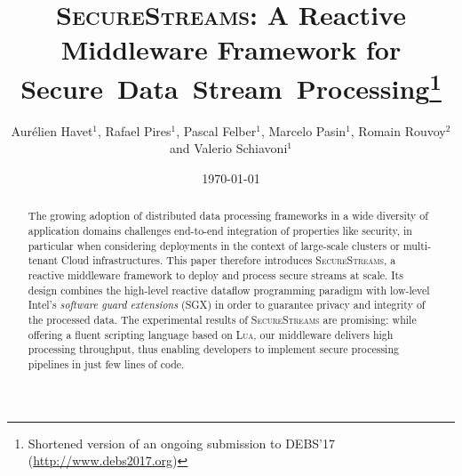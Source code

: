 \documentclass[systeme]{compas2017}
\newcommand{\SYS}{\textsc{SecureStreams}\xspace}
\begin{document}
\title{\SYS: A Reactive Middleware Framework for Secure~Data~Stream~Processing\thanks{Shortened version of an ongoing submission to DEBS'17 (\url{http://www.debs2017.org})}}
\shorttitle{\SYS}

\author{Aurélien Havet$^1$, Rafael Pires$^1$, Pascal Felber$^1$, Marcelo Pasin$^1$, Romain Rouvoy$^2$ and Valerio Schiavoni$^1$}%

\address{$^1$~University of Neuchâtel, Switzerland. Email: first.last@unine.ch\\
$^2$~Univ. Lille / Inria / IUF, France. Email: romain.rouvoy@univ-lille.fr}

\date{\today}

\maketitle

\begin{abstract}
The growing adoption of distributed data processing frameworks in a wide diversity of application domains challenges end-to-end integration of properties like security, in particular when considering deployments in the context of large-scale clusters or multi-tenant Cloud infrastructures.
% 
This paper therefore introduces \SYS{}, a reactive middleware framework to deploy and process secure streams at scale.
Its design combines the high-level reactive dataflow programming paradigm with low-level Intel's \emph{software guard extensions} (SGX) in order to guarantee privacy and integrity of the processed data.
The experimental results of \SYS{} are promising: while offering a fluent scripting language based on \textsc{Lua}, our middleware delivers high processing throughput, thus enabling developers to implement secure processing pipelines in just few lines of code.
\end{abstract}









\end{document}
